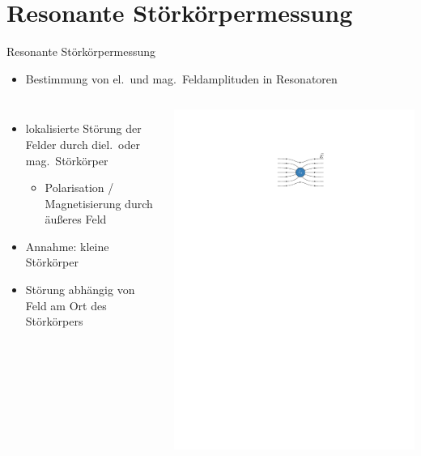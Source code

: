 \documentclass[12pt,xcolor=dvipsnames,professionalfonts]{beamer}
\begin{document}
\section{Resonante Störkörpermessung}

\begin{frame}{Resonante Störkörpermessung}
	\begin{itemize}
		\item Bestimmung von el.\ und mag.\ Feldamplituden in Resonatoren
	\end{itemize}
	\vspace*{0.12cm}
	\begin{columns}[c,onlytextwidth]
		\begin{itemize}
			\setlength\itemsep{1.25em}
			\item lokalisierte Störung der Felder durch diel.\ oder mag.\ Störkörper
			\begin{itemize}
				\item Polarisation / Magnetisierung durch äußeres Feld
			\end{itemize}
			
			\item Annahme: kleine Störkörper

			\item Störung abhängig von Feld am Ort des Störkörpers
		
	\end{itemize}
		\centering
		\includegraphics[scale=1.0]{./figures/stoerung.pdf}
		

\end{columns}
\end{frame}
\end{document}
